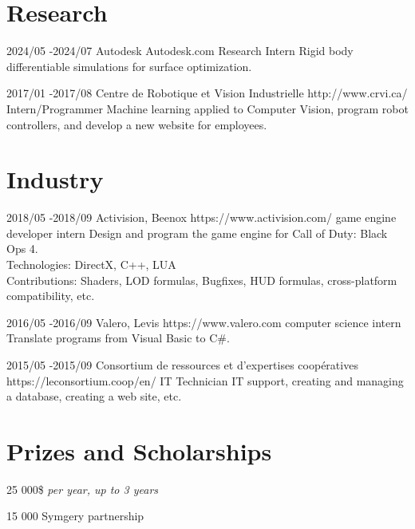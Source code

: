 \documentclass[10pt]{article} %
\begin{document}
\section{Research}
\job
{2024/05 -}{2024/07}
{Autodesk}
{Autodesk.com}
{Research Intern}
{Rigid body differentiable simulations for surface optimization.}

\job
{2017/01 -}{2017/08}
{Centre de Robotique et Vision Industrielle}
{http://www.crvi.ca/}
{Intern/Programmer}
{Machine learning applied to Computer Vision, program robot controllers, and develop a new website for employees.}

\section{Industry}

\job
{2018/05 -}{2018/09}
{Activision, Beenox}
{https://www.activision.com/}
{game engine developer intern}
{Design and program the game engine for Call of Duty: Black Ops 4.\\
 Technologies: DirectX, C++, LUA \\
 Contributions: Shaders, LOD formulas, Bugfixes, HUD formulas, cross-platform compatibility, etc.}

\job
{2016/05 -}{2016/09}
{Valero, Levis}
{https://www.valero.com}
{computer science intern}
{Translate programs from Visual Basic to C\#.}

\job
{2015/05 -}{2015/09}
{Consortium de ressources et d'expertises coopératives}
{https://leconsortium.coop/en/}
{IT Technician}
{IT support, creating and managing a database, creating a web site, etc.}


\section{Prizes and Scholarships}

{
 25 000\$ \textit{per year, up to 3 years} \\
}

{
 15 000 Symgery partnership \\
}
\end{document}
